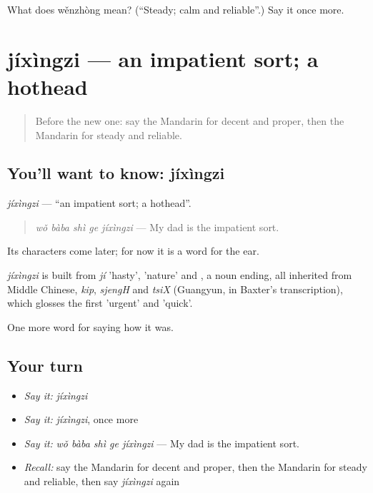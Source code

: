 \begin{tcolorbox}[breakable,colback=teal!4,colframe=teal!35!black,title={Before you move on}]
What does wěnzhòng mean? (\textquotedblleft{}Steady; calm and reliable\textquotedblright{}.) Say it once more.
\end{tcolorbox}
\section[jíxìngzi]{jíxìngzi — an impatient sort; a hothead}

\label{lesson:ZH-C469-jixingzi}



\begin{quote}
Before the new one: say the Mandarin for decent and proper, then the Mandarin for steady and reliable.
\end{quote}

\subsection*{You'll want to know: jíxìngzi}
\emph{jíxìngzi} — \textquotedblleft{}an impatient sort; a hothead\textquotedblright{}.

\begin{quote}
\emph{wǒ bàba shì ge jíxìngzi} — My dad is the impatient sort.
\end{quote}

Its characters come later; for now it is a word for the ear.

\begin{cousinweb}
\emph{jíxìngzi} is built from \emph{jí} 'hasty',  'nature' and , a noun ending, all inherited from Middle Chinese, \emph{kip}, \emph{sjengH} and \emph{tsiX} (Guangyun, in Baxter's transcription), which glosses the first 'urgent' and 'quick'.
\end{cousinweb}

\begin{grammarlens}[title={What you've built}]
One more word for saying how it was.
\end{grammarlens}

\subsection*{Your turn}
\begin{itemize}
\raggedright
  \item \emph{Say it:} \emph{jíxìngzi}
  \item \emph{Say it:} \emph{jíxìngzi}, once more
  \item \emph{Say it:} \emph{wǒ bàba shì ge jíxìngzi} — My dad is the impatient sort.
  \item \emph{Recall:} say the Mandarin for decent and proper, then the Mandarin for steady and reliable, then say \emph{jíxìngzi} again
\end{itemize}

